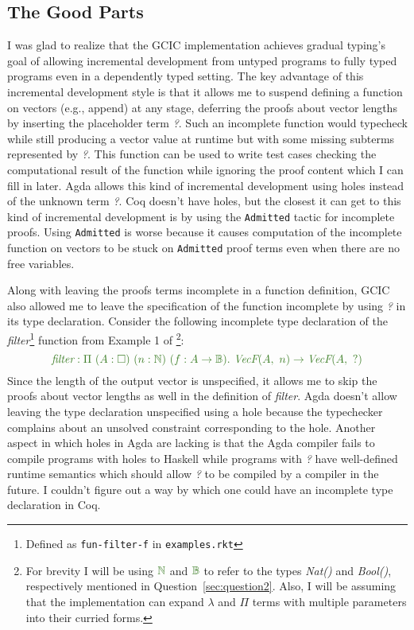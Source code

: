 \documentclass{article}
\theoremstyle{definition}
\newcommand{\Gcode}[1]{{\color{OliveGreen}\textit{#1}}}
\newcommand{\Gcmath}[1]{{\color{OliveGreen}#1}}
\begin{document}
\subsection{The Good Parts}\label{sec:good-parts}
I was glad to realize that the GCIC implementation achieves gradual typing's
goal of allowing incremental development from untyped programs to fully typed
programs even in a dependently typed setting. The key advantage of this
incremental development style is that it allows me to suspend defining a
function on vectors (e.g., append) at any stage, deferring the proofs about
vector lengths by inserting the placeholder term \Gcode{?}. Such an incomplete
function would typecheck while still producing a vector value at runtime but
with some missing subterms represented by \Gcode{?}. This function can be used
to write test cases checking the computational result of the function while
ignoring the proof content which I can fill in later. Agda allows this kind of
incremental development using holes instead of the unknown term \Gcode{?}. Coq
doesn't have holes, but the closest it can get to this kind of incremental
development is by using the \texttt{Admitted} tactic for incomplete proofs.
Using \texttt{Admitted} is worse because it causes computation of the incomplete
function on vectors to be stuck on \texttt{Admitted} proof terms even when there
are no free variables.

Along with leaving the proofs terms incomplete in a function definition, GCIC
also allowed me to leave the specification of the function incomplete by using
\Gcode{?} in its type declaration. Consider the following incomplete type
declaration of the \Gcode{filter}\footnote{Defined as \texttt{fun-filter-f} in
\texttt{examples.rkt}} function from Example 1 of
\citet{lennon-bertrand_gradualizing_2022}\footnote{For brevity I will be using
\(\Gcmath{\mathbb{N}}\) and \(\Gcmath{\mathbb{B}}\) to refer to the types
\Gcode{Nat()} and \Gcode{Bool()}, respectively mentioned in
Question~\ref{sec:question2}. Also, I will be assuming that the implementation
can expand \(\lambda\) and \(\Pi\) terms with multiple parameters into their
curried forms.}:
\[
\Gcmath{\textit{filter} : \Pi\ (A: \square)\ (n: \mathbb{N})\ (f : A \to \mathbb{B}).\
  \textit{VecF}(A,\ n) \to \textit{VecF}(A,\ ?)}
\]
Since the length of the output vector is unspecified, it allows me to skip the
proofs about vector lengths as well in the definition of \Gcode{filter}. Agda
doesn't allow leaving the type declaration unspecified using a hole because the
typechecker complains about an unsolved constraint corresponding to the hole.
Another aspect in which holes in Agda are lacking is that the Agda compiler
fails to compile programs with holes to Haskell while programs with \Gcode{?}
have well-defined runtime semantics which should allow \Gcode{?} to be compiled
by a compiler in the future. I couldn't figure out a way by which one could have
an incomplete type declaration in Coq.
\end{document}
